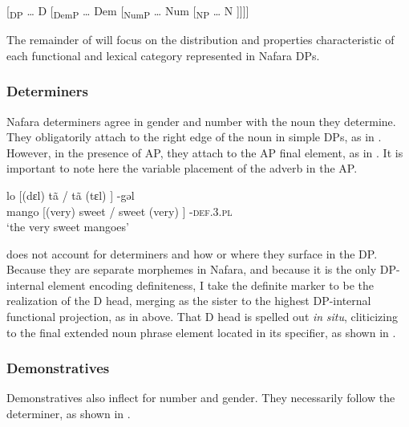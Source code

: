 \documentclass[output=paper]{langscibook}
\begin{document}
\ea{} \label{ex:baron:2}
 [\textsubscript{DP} … D [\textsubscript{DemP} … Dem [\textsubscript{NumP} … Num [\textsubscript{NP} … N ]]]]
\z

The remainder of  will focus on the distribution and properties characteristic of each functional and lexical category represented in Nafara DPs. 


\subsubsection{Determiners}
\label{sec:baron:2.1.2}
Nafara determiners agree in gender and number with the noun they determine. They obligatorily attach to the right edge of the noun in simple DPs, as in . However, in the presence of AP, they attach to the AP final element, as in . It is important to note here the variable placement of the adverb in the AP.


\ea\label{ex:baron:3}
\z
\z

\ea\label{ex:baron:4}
\gll   lo [(dɛl) tã     / tã   (tɛl) ]  -gəl \\
   mango [(very) sweet / sweet (very) ] -\textsc{def.3.pl}\\
 \glt  ‘the very sweet mangoes’  
\z

\citet{Cinque2005} does not account for determiners and how or where they surface in the DP. Because they are separate morphemes in Nafara, and because it is the only DP-internal element encoding definiteness, I take the definite marker to be the realization of the D head, merging as the sister to the highest DP-internal functional projection, as in  above. That D head is spelled out \textit{in} \textit{situ}, cliticizing to the final extended noun phrase element located in its specifier, as shown in .


\subsubsection{Demonstratives}
\label{sec:baron:2.1.3}
Demonstratives also inflect for number and gender. They necessarily follow the determiner, as shown in .
\end{document}
